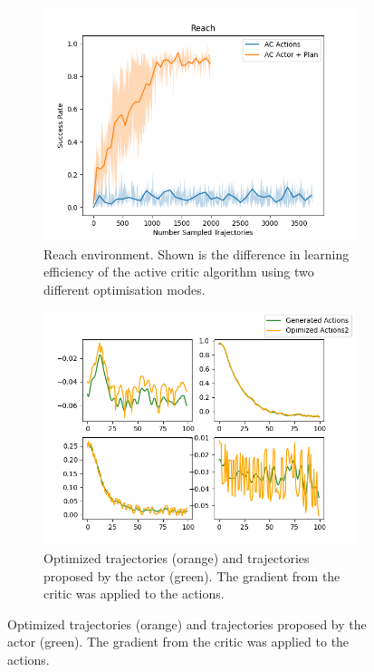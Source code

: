 \begin{figure}[htbp]
    \centering
    \begin{subfigure}[t]{0.65\textwidth}
      \includegraphics[width=\textwidth]{images/Plan_vs_Actions/Reach.png}
      \caption{Reach environment. Shown is the difference in learning efficiency of the active critic algorithm using two different optimisation modes.}
      \label{fig:plot1}
    \end{subfigure}
    \medskip
    \begin{subfigure}[t]{0.45\textwidth}
      \includegraphics[width=\textwidth]{images/Plan_vs_Actions/changes/actions_1.png}
      \caption{Optimized trajectories (orange) and trajectories proposed by the actor (green). The gradient from the critic was applied to the actions.}

\end{subfigure}
\end{figure}
